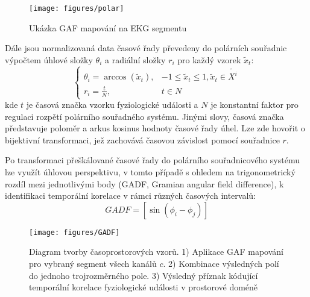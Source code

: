 \begin{figure}[h]
    \begin{center}
        \texttt{[image: figures/polar]}
        \caption{Ukázka \gls{GAF} mapování na EKG segmentu}
        \label{fig:polar}
    \end{center}
\end{figure}

Dále jsou normalizovaná data časové řady převedeny do polárních souřadnic
výpočtem úhlové složky $\theta_i$ a radiální složky $r_i$ pro každý vzorek
$\tilde{x}_t$:
\begin{equation}
    \begin{cases}
        \theta_i = \arccos(\tilde{x}_t), & -1 \leq \tilde{x}_t \leq 1, \tilde{x}_t \in \tilde{X^i} \\
        r_i = \frac{t}{N},               & t \in N
    \end{cases}
\end{equation}
kde $t$ je časová značka vzorku fyziologické události a $N$ je konstantní faktor
pro regulaci rozpětí polárního souřadného systému. Jinými slovy, časová značka
představuje poloměr a arkus kosinus hodnoty časové řady úhel. Lze zde hovořit o
bijektivní transformaci, jež zachovává časovou závislost pomocí souřadnice $r$.

Po transformaci přeškálované časové řady do polárního souřadnicového systému lze
využít úhlovou perspektivu, v tomto případě s ohledem na trigonometrický rozdíl
mezi jednotlivými body (\gls{GADF}, Gramian angular field difference), k
identifikaci temporální korelace v rámci různých časových intervalů:
\begin{equation}
    GADF = \left[\sin \left(\phi_i-\phi_j\right)\right]
\end{equation}

\begin{figure}[h]
    \begin{center}
        \texttt{[image: figures/GADF]}
        \caption{Diagram tvorby časoprostorových vzorů. 1) Aplikace GAF mapování
            pro vybraný segment všech kanálů $c$. 2) Kombinace výsledných polí
            do jednoho trojrozměrného pole. 3) Výsledný příznak kódující
            temporální korelace fyziologické události v prostorové doméně}
        \label{fig:gadf}
    \end{center}
\end{figure}

